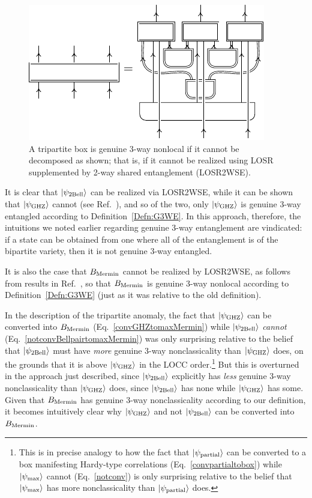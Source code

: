 \documentclass[12pt]{article}
\newcommand{\ket}[1]{\left| #1 \right>}
\theoremstyle{plain}
\theoremstyle{definition}
\begin{document}
\begin{figure}[htb!]
\centering
    \includegraphics[scale=1]{fig_non_locality.pdf}
    \caption{
           A tripartite box is genuine 3-way nonlocal if it cannot be decomposed as shown; that is, if it cannot be realized using LOSR supplemented by 2-way shared entanglement (LOSR2WSE).  }
    \label{non_locality}
\end{figure}


 It is clear that $\ket{\psi_{\rm 2Bell}}$ can be realized via LOSR2WSE,
  while it can be shown that $\ket{\psi_{\rm GHZ}}$ cannot (see  Ref.~\cite{navascues2020genuine}), and so of the two, only $\ket{\psi_{\rm GHZ}}$ is genuine 3-way entangled according to Definition~\ref{Defn:G3WE}.
   In this approach, therefore, the intuitions we noted earlier regarding genuine 3-way entanglement are vindicated: if a state can be obtained from one where all of the entanglement is of the bipartite variety, then it is not genuine 3-way entangled.  

 It is also the case that 
 $B_{\rm Mermin}$ cannot be realized by LOSR2WSE, as follows from results
 in Ref.~\cite{wolfe2021infl}, so that  $B_{\rm Mermin}$ is genuine 3-way nonlocal according to Definition~\ref{Defn:G3WE}
   (just as it was relative to the old definition).
 
In the description of the tripartite anomaly, the fact that $\ket{\psi_{\rm GHZ}}$ can be converted into $B_{\rm Mermin}$ (Eq.~\eqref{convGHZtomaxMermin})  while $\ket{\psi_{\rm 2Bell}}$ {\em cannot} (Eq.~\eqref{notconvBellpairtomaxMermin})
 was only surprising relative to the belief that $\ket{\psi_{\rm 2Bell}}$ must have {\em more} genuine 3-way nonclassicality than $\ket{\psi_{\rm GHZ}}$ does, on the grounds that it is above $\ket{\psi_{\rm GHZ}}$ in the LOCC order.\footnote{This is in precise analogy to how the fact that $\ket{\psi_{\rm partial}}$ can be converted to a box manifesting Hardy-type correlations (Eq.~\eqref{convpartialtobox}) while $\ket{\psi_{\rm max}}$ cannot (Eq.~\eqref{notconv}) is only surprising relative to the belief that $\ket{\psi_{\rm max}}$ has more nonclassicality than $\ket{\psi_{\rm partial}}$ does.} But this is overturned in the approach just described, since  $\ket{\psi_{\rm 2Bell}}$ explicitly has {\em less} genuine 3-way nonclassicality than $\ket{\psi_{\rm GHZ}}$ does, since $\ket{\psi_{\rm 2Bell}}$ has none while $\ket{\psi_{\rm GHZ}}$ has some.
 Given that $B_{\rm Mermin}$ has genuine 3-way nonclassicality according to our definition, it becomes intuitively clear why  $\ket{\psi_{\rm GHZ}}$ and not $\ket{\psi_{\rm 2Bell}}$ can be converted into $B_{\rm Mermin}$.
\end{document}
